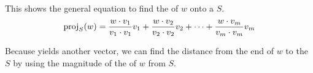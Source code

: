 This shows the general equation to find the  of $w$ onto a  $S$.
\begin{equation}\label{eq:Vector_Projected_onto_Span}
  \Proj{w}{S} = \frac{w \cdot v_{1}}{v_{1} \cdot v_{1}} v_{1} + \frac{w \cdot v_{2}}{v_{2} \cdot v_{2}} v_{2} + \cdots + \frac{w \cdot v_{m}}{v_{m} \cdot v_{m}} v_{m}
\end{equation}

\begin{blackbox}
  Because  yields another vector, we can find the distance from the end of $w$ to the  $S$ by using the magnitude of the  of $w$ from $S$.
\end{blackbox}

